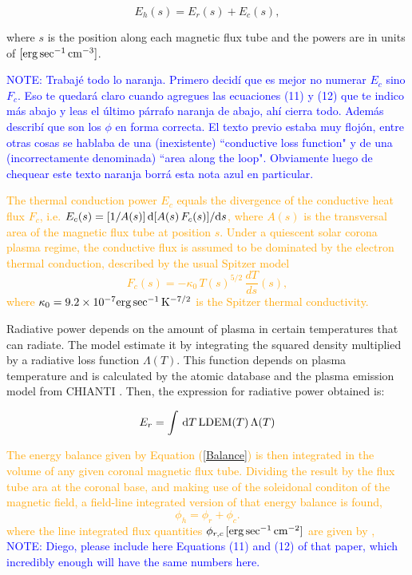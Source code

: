 \documentclass[namedreferences]{solarphysics}
\newcommand{\LDEM}{{\rm LDEM}}
\def\albert#1{\textcolor{orange}{#1}}
\def\notebyalbert#1{\textcolor{blue}{NOTE: #1}}
\begin{document}
\begin{article}
\begin{equation}\label{Balance}
E_h(s) = E_r(s)+ E_c(s),
\end{equation}

\noindent
where $s$ is the position along each magnetic flux tube and the powers are in units of $[{\rm erg\,sec^{-1}\,cm^{-3}}]$.

\noindent\notebyalbert{Trabajé todo lo naranja. Primero decidí que es mejor no numerar $E_c$ sino $F_c$. Eso te quedará claro cuando agregues las ecuaciones (11) y (12) que te indico más abajo y leas el último párrafo naranja de abajo, ahí cierra todo. Además describí que son los $\phi$ en forma correcta. El texto previo estaba muy flojón, entre otras cosas se hablaba de una (inexistente) ``conductive loss function" y de una (incorrectamente denominada) ``area along the loop". Obviamente luego de chequear este texto naranja borrá esta nota azul en particular.}

\albert{The thermal conduction power $E_c$ equals the divergence of the conductive heat flux $F_c$, i.e.
$E_c(s)=[1/A(s)]\,{\rm d}[A(s)\,F_c(s)]/{\rm d}s$, where $A(s)$ is the transversal area of the magnetic flux tube at position $s$. Under a quiescent solar corona plasma regime, the conductive flux is assumed to be dominated by the electron thermal conduction, described by the usual Spitzer model \citep{spitzer_1962}
\begin{equation}\label{Fc}
F_c(s)=-\kappa_0\,{T(s)}^{5/2}\,\frac{dT}{ds}(s),
\end{equation}
where $\kappa_0 = 9.2 \times 10^{-7}  {\rm erg\,sec^{-1}\,K^{-7/2}}$ is the Spitzer thermal conductivity.}

Radiative power depends on the amount of plasma in certain temperatures that can radiate. The model estimate it by integrating the squared density multiplied by a radiative loss function $\Lambda(T)$. This function depends on plasma temperature and is calculated by the atomic database and the plasma emission model from CHIANTI \citep{delzanna_2015}. Then, the expression for radiative power obtained is:

\begin{equation}\label{Er}
E_r = \int\,\textrm{d}T\,\LDEM(T)\,\Lambda(T)
\end{equation}

\albert{The energy balance given by Equation (\ref{Balance}) is then integrated in the volume of any given coronal magnetic flux tube. Dividing the result by the flux tube ara at the coronal base, and making use of the soleidonal conditon of the magnetic field, a field-line integrated version of that energy balance is found,
\begin{equation}\label{FluxBalance}
\phi_h = \phi_r + \phi_c.
\end{equation}
\noindent
where the line integrated flux quantities $\phi_{r,c}\,[\rm{erg\,sec^{-1}\,cm^{-2}}]$ are given by \citep{maccormack_2017},}\\
\notebyalbert{Diego, please include here Equations (11) and (12) of that paper, which incredibly enough will have the same numbers here.}


\end{article}
\end{document}
